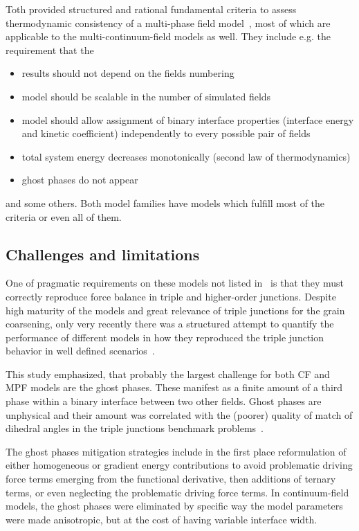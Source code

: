 	Toth provided structured and rational fundamental criteria to assess thermodynamic consistency of a multi-phase field model~\cite{Toth2015}, most of which are applicable to the multi-continuum-field models as well. They include e.g. the requirement that the 
	\begin{itemize}
		\item results should not depend on the fields numbering
		\item model should be scalable in the number of simulated fields
		\item model should allow assignment of binary interface properties (interface energy and kinetic coefficient) independently to every possible pair of fields
		\item total system energy decreases monotonically (second law of thermodynamics)
		\item ghost phases do not appear
	\end{itemize}
	and some others. Both model families have models which fulfill most of the criteria or even all of them. 

	\subsection{Challenges and limitations}
	One of pragmatic requirements on these models not listed in~\cite{Toth2015} is that they must correctly reproduce force balance in triple and higher-order junctions. Despite high maturity of the models and great relevance of triple junctions for the grain coarsening, only very recently there was a structured attempt to quantify the performance of different models in how they reproduced the triple junction behavior in well defined scenarios~\cite{Daubner2023}.
	
	This study emphasized, that probably the largest challenge for both CF and MPF models are the ghost phases. These manifest as a finite amount of a third phase within a binary interface between two other fields. Ghost phases are unphysical and their amount was correlated with the (poorer) quality of match of dihedral angles in the triple junctions benchmark problems~\cite{Daubner2023}. 
	
	The ghost phases mitigation strategies include in the first place reformulation of either homogeneous or gradient energy contributions to avoid problematic driving force terms emerging from the functional derivative, then additions of ternary terms, or even neglecting the problematic driving force terms. In continuum-field models, the ghost phases were eliminated by specific way the model parameters were made anisotropic, but at the cost of having variable interface width. 
	
